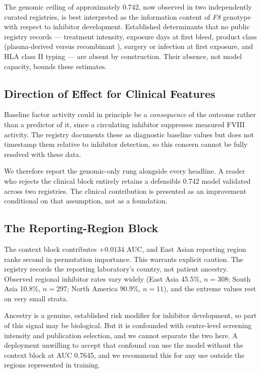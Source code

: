 \documentclass[conference]{IEEEtran}
\begin{document}
The genomic ceiling of approximately 0.742, now observed in two independently
curated registries, is best interpreted as the information content of
\textit{F8} genotype with respect to inhibitor development. Established
determinants that no public registry records --- treatment intensity, exposure
days at first bleed, product class (plasma-derived versus recombinant
\cite{sippet}), surgery or infection at first exposure, and HLA class II typing
--- are absent by construction. Their absence, not model capacity, bounds these
estimates.

\subsection{Direction of Effect for Clinical Features}
Baseline factor activity could in principle be a \textit{consequence} of the
outcome rather than a predictor of it, since a circulating inhibitor suppresses
measured FVIII activity. The registry documents these as diagnostic baseline
values but does not timestamp them relative to inhibitor detection, so this
concern cannot be fully resolved with these data.

We therefore report the genomic-only rung alongside every headline. A reader
who rejects the clinical block entirely retains a defensible 0.742 model
validated across two registries. The clinical contribution is presented as an
improvement conditional on that assumption, not as a foundation.

\subsection{The Reporting-Region Block}
The context block contributes $+0.0134$ AUC, and East Asian reporting region
ranks second in permutation importance. This warrants explicit caution. The
registry records the reporting laboratory's country, not patient ancestry.
Observed regional inhibitor rates vary widely (East Asia 45.5\%, $n = 308$;
South Asia 10.8\%, $n = 297$; North America 90.9\%, $n = 11$), and the extreme
values rest on very small strata.

Ancestry is a genuine, established risk modifier for inhibitor development, so
part of this signal may be biological. But it is confounded with centre-level
screening intensity and publication selection, and we cannot separate the two
here. A deployment unwilling to accept that confound can use the model without
the context block at AUC 0.7645, and we recommend this for any use outside the
regions represented in training.
\end{document}
